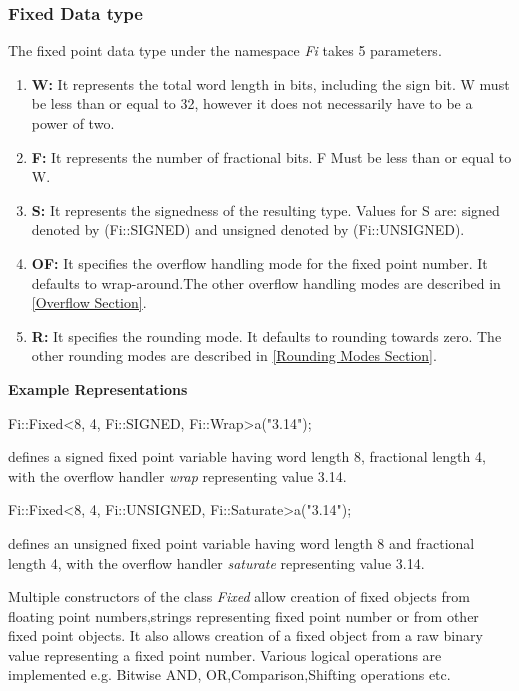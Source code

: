 \subsubsection{Fixed Data type}
The fixed point data type under the namespace \textit{Fi} takes 5 parameters.
\begin{enumerate}
\item
\textbf{W:} It represents the total word length in bits, including the sign bit. W must be less than or equal to 32, however it does not necessarily have to be a power of two.
\item
\textbf{F:} It represents the number of fractional bits. F Must be less than or equal to W.
\item
\textbf{S:} It represents the signedness of the resulting type. Values for S are: signed denoted by (Fi::SIGNED) and unsigned denoted by (Fi::UNSIGNED).
\item
\textbf{OF:} It specifies the overflow handling mode for the fixed point number. It defaults to wrap-around.The other overflow handling modes are described in \ref{Overflow Section}. 
\item
\textbf{R:} It specifies the rounding mode. It defaults to rounding towards zero. The other rounding modes are described in \ref{Rounding Modes Section}.
\end{enumerate}
\vspace{0.5cm}
\textbf{Example Representations}

Fi::Fixed\textless8, 4, Fi::SIGNED, Fi::Wrap\textgreater a("3.14");

defines a signed fixed point variable having word length 8, fractional length 4, with the overflow handler \textit{wrap} representing value 3.14.

\vspace{0.5cm}
Fi::Fixed\textless8, 4, Fi::UNSIGNED, Fi::Saturate\textgreater a("3.14");

defines an unsigned fixed point variable having word length 8 and fractional length 4, with the overflow handler \textit{saturate} representing value 3.14.

\noindent Multiple constructors of the class \textit{Fixed} allow creation of fixed objects from floating point numbers,strings representing fixed point number or from other fixed point objects.
It also allows creation of a fixed object from a raw binary value representing a fixed point number.
Various logical operations are implemented e.g. Bitwise AND, OR,Comparison,Shifting operations etc.
